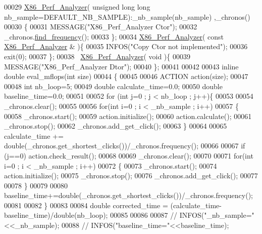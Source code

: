 \begin{DoxyCode}
00029   \hyperlink{class_x86___perf___analyzer}{X86\_Perf\_Analyzer}( \textcolor{keywordtype}{unsigned} \textcolor{keywordtype}{long} \textcolor{keywordtype}{long} nb\_sample=DEFAULT\_NB\_SAMPLE):\_nb\_sample(nb\_sample)
      ,\_chronos()
00030   \{
00031     MESSAGE(\textcolor{stringliteral}{"X86\_Perf\_Analyzer Ctor"});
00032     \_chronos.\hyperlink{class_x86___timer_a1beddd8cb10ed89d3dd06d3b233b63e1}{find\_frequency}();
00033   \};
00034   \hyperlink{class_x86___perf___analyzer}{X86\_Perf\_Analyzer}( \textcolor{keyword}{const} \hyperlink{class_x86___perf___analyzer}{X86\_Perf\_Analyzer} & )\{
00035     INFOS(\textcolor{stringliteral}{"Copy Ctor not implemented"});
00036     exit(0);
00037   \};
00038   ~\hyperlink{class_x86___perf___analyzer}{X86\_Perf\_Analyzer}( \textcolor{keywordtype}{void} )\{
00039     MESSAGE(\textcolor{stringliteral}{"X86\_Perf\_Analyzer Dtor"});
00040   \};
00041 
00042 
00043   \textcolor{keyword}{inline} \textcolor{keywordtype}{double} eval\_mflops(\textcolor{keywordtype}{int} size)
00044   \{
00045 
00046     ACTION action(size);
00047 
00048     \textcolor{keywordtype}{int} nb\_loop=5;
00049     \textcolor{keywordtype}{double} calculate\_time=0.0;
00050     \textcolor{keywordtype}{double} baseline\_time=0.0;
00051 
00052     \textcolor{keywordflow}{for} (\textcolor{keywordtype}{int} j=0 ; j < nb\_loop ; j++)\{
00053 
00054       \_chronos.clear();
00055 
00056       \textcolor{keywordflow}{for}(\textcolor{keywordtype}{int} i=0 ; i < \_nb\_sample  ; i++)
00057       \{
00058         \_chronos.start();
00059         action.initialize();
00060         action.calculate();
00061         \_chronos.stop();
00062         \_chronos.add\_get\_click();
00063       \}
00064 
00065       calculate\_time += double(\_chronos.get\_shortest\_clicks())/\_chronos.frequency();
00066 
00067       \textcolor{keywordflow}{if} (j==0) action.check\_result();
00068 
00069       \_chronos.clear();
00070 
00071       \textcolor{keywordflow}{for}(\textcolor{keywordtype}{int} i=0 ; i < \_nb\_sample  ; i++)
00072       \{
00073         \_chronos.start();
00074         action.initialize();
00075         \_chronos.stop();
00076         \_chronos.add\_get\_click();
00077 
00078       \}
00079 
00080       baseline\_time+=double(\_chronos.get\_shortest\_clicks())/\_chronos.frequency();
00081 
00082     \}
00083 
00084     \textcolor{keywordtype}{double} corrected\_time = (calculate\_time-baseline\_time)/\textcolor{keywordtype}{double}(nb\_loop);
00085 
00086 
00087 \textcolor{comment}{//     INFOS("\_nb\_sample="<<\_nb\_sample);}
00088 \textcolor{comment}{//     INFOS("baseline\_time="<<baseline\_time);}

\end{DoxyCode}
